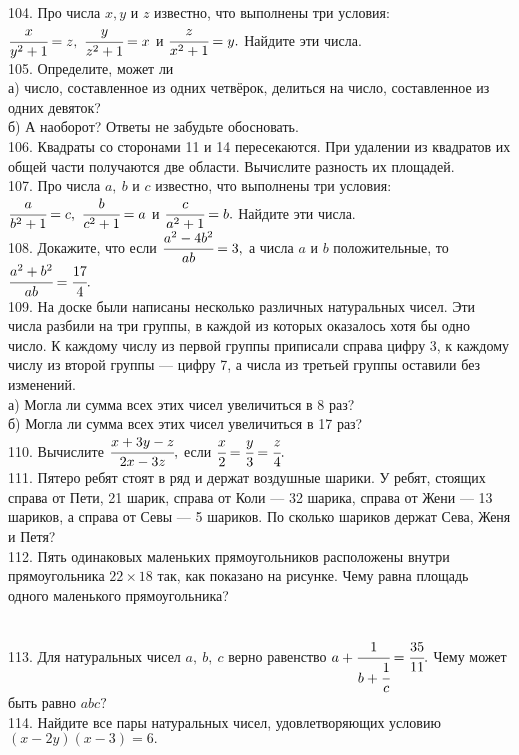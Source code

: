 104. Про числа $x, y$ и $z$ известно, что выполнены три условия: $\cfrac{x}{y^2+1}=z,\ \cfrac{y}{z^2+1}=x$ и $\cfrac{z}{x^2+1}=y.$ Найдите эти числа.\\
105. Определите, может ли\\
а) число, составленное из одних четвёрок, делиться на число, составленное из одних девяток?\\
б) А наоборот? Ответы не забудьте обосновать.\\
106. Квадраты со сторонами 11 и 14 пересекаются. При удалении из квадратов их общей части получаются две области. Вычислите разность их площадей.\\
107. Про числа $a,\ b$ и $c$ известно, что выполнены три условия: $\cfrac{a}{b^2+1}=c,\ \cfrac{b}{c^2+1}=a$ и $\cfrac{c}{a^2+1}=b.$ Найдите эти числа.\\
108. Докажите, что если $\cfrac{a^2-4b^2}{ab}=3,$ а числа $a$ и $b$ положительные, то $\cfrac{a^2+b^2}{ab}=\cfrac{17}{4}.$\\
109. На доске были написаны несколько различных натуральных чисел. Эти числа разбили на три группы, в каждой из которых оказалось хотя бы одно число.
К каждому числу из первой группы приписали справа цифру 3, к каждому числу из второй группы --- цифру 7, а числа из третьей группы оставили без изменений.\\
а) Могла ли сумма всех этих чисел увеличиться в 8 раз?\\
б) Могла ли сумма всех этих чисел увеличиться в 17 раз?\\
110. Вычислите $\cfrac{x+3y-z}{2x-3z},$ если $\cfrac{x}{2}=\cfrac{y}{3}=\cfrac{z}{4}.$\\
111. Пятеро ребят стоят в ряд и держат воздушные шарики. У ребят, стоящих справа от Пети, 21 шарик, справа от Коли --- 32 шарика, справа от Жени --- 13 шариков, а справа от Севы --- 5 шариков. По сколько шариков держат Сева, Женя и Петя?\\
112. Пять одинаковых маленьких прямоугольников расположены внутри прямоугольника $22\times18$ так, как показано на рисунке. Чему равна площадь одного маленького прямоугольника?\\
\begin{figure}[ht!]
\end{figure}\\
113. Для натуральных чисел $a,\ b,\ c$ верно равенство $a+\cfrac{1}{b+\cfrac{1}{c}}=\cfrac{35}{11}.$ Чему может быть равно $abc?$\\
114. Найдите все пары натуральных чисел, удовлетворяющих условию $(x-2y)(x-3)=6.$\\
